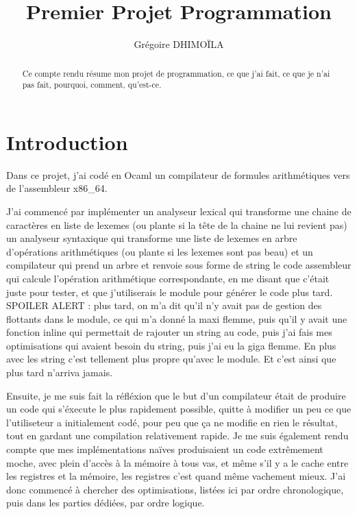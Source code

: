 \documentclass{article}
\title{Premier Projet Programmation}
\author{Grégoire DHIMOÏLA}
\begin{document}
\maketitle

\begin{abstract}
Ce compte rendu résume mon projet de programmation, ce que j'ai fait, ce que je n'ai pas fait, pourquoi, comment, qu'est-ce.
\end{abstract}

\section{Introduction}

Dans ce projet, j'ai codé en Ocaml un compilateur de formules arithmétiques vers de l'assembleur x86\_64.


J'ai commencé par implémenter un analyseur lexical qui transforme une chaine de caractères en liste de lexemes (ou plante si la tête de la chaine ne lui revient pas) un analyseur syntaxique qui transforme une liste de lexemes en arbre d'opérations arithmétiques (ou plante si les lexemes sont pas beau) et un compilateur qui prend un arbre et renvoie sous forme de string le code assembleur qui calcule l'opération arithmétique correspondante, en me disant que c'était juste pour tester, et que j'utiliserais le module pour générer le code plus tard.\newline
{\tiny SPOILER ALERT : plus tard, on m'a dit qu'il n'y avait pas de gestion des flottants dans le module, ce qui m'a donné la maxi flemme, puis qu'il y avait une fonction inline qui permettait de rajouter un string au code, puis j'ai fais mes optimisations qui avaient besoin du string, puis j'ai eu la giga flemme. En plus avec les string c'est tellement plus propre qu'avec le module. Et c'est ainsi que plus tard n'arriva jamais.}

Ensuite, je me suis fait la réfléxion que le but d'un compilateur était de produire un code qui s'éxecute le plus rapidement possible, quitte à modifier un peu ce que l'utiliseteur a initialement codé, pour peu que ça ne modifie en rien le résultat, tout en gardant une compilation relativement rapide. Je me suis également rendu compte que mes implémentations naïves produisaient un code extrêmement moche, avec plein d'accès à la mémoire à tous vas, et même s'il y a le cache entre les registres et la mémoire, les registres c'est quand même vachement mieux. J'ai donc commencé à chercher des optimisations, listées ici par ordre chronologique, puis dans les parties dédiées, par ordre logique.
\end{document}
